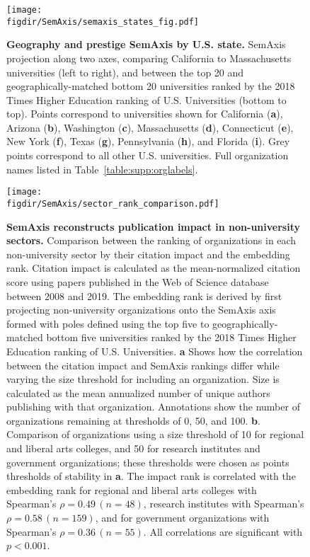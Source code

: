 \documentclass[12pt]{article} %
\def\figdir{../Figs}
\begin{document}
%
%
\begin{figure}[hp!]
	\centering
	\texttt{[image: \\figdir/SemAxis/semaxis\_states\_fig.pdf]}
	\caption{
		\textbf{Geography and prestige SemAxis by U.S. state.}
		SemAxis projection along two axes, comparing California to Massachusetts universities (left to right), and between the top 20 and geographically-matched bottom 20 universities ranked by the 2018 Times Higher Education ranking of U.S. Universities (bottom to top).
		Points correspond to universities shown for California (\textbf{a}), Arizona (\textbf{b}), Washington (\textbf{c}), Massachusetts (\textbf{d}), Connecticut (\textbf{e}), New York (\textbf{f}), Texas (\textbf{g}), Pennsylvania (\textbf{h}), and Florida (\textbf{i}).
		Grey points correspond to all other U.S. universities.
		Full organization names listed in Table~\ref{table:supp:orglabels}.
	}
	\label{fig:supp:semaxis_states}
\end{figure}





%
%
\begin{figure}[hp!]
	\centering
	\texttt{[image: \\figdir/SemAxis/sector\_rank\_comparison.pdf]}
	\caption{
		\textbf{SemAxis reconstructs publication impact in non-university sectors.}
		Comparison between the ranking of organizations in each non-university sector by their citation impact and the embedding rank.
		Citation impact is calculated as the mean-normalized citation score using papers published in the Web of Science database between 2008 and 2019. 
		The embedding rank is derived by first projecting non-university organizations onto the SemAxis axis formed with poles defined using the top five to geographically-matched bottom five universities ranked by the 2018 Times Higher Education ranking of U.S. Universities.
		\textbf{a} Shows how the correlation between the citation impact and SemAxis rankings differ while varying the size threshold for including an organization.
		Size is calculated as the mean annualized number of unique authors publishing with that organization. 
		Annotations show the number of organizations remaining at thresholds of 0, 50, and 100. 
		\textbf{b}. Comparison of organizations using a size threshold of 10 for regional and liberal arts colleges, and 50 for research institutes and government organizations;
		these thresholds were chosen as points thresholds of stability in \textbf{a}. 		
		The impact rank is correlated with the embedding rank for regional and liberal arts colleges with Spearman's $\rho = 0.49\,(n = 48)$, research institutes with Spearman's $\rho = 0.58\,(n = 159)$, and for government organizations with Spearman's $\rho = 0.36\,(n = 55)$. 
		All correlations are significant with $p < 0.001$. 
	}
	\label{fig:supp:sector_semaxis_impact}
\end{figure}
\end{document}
